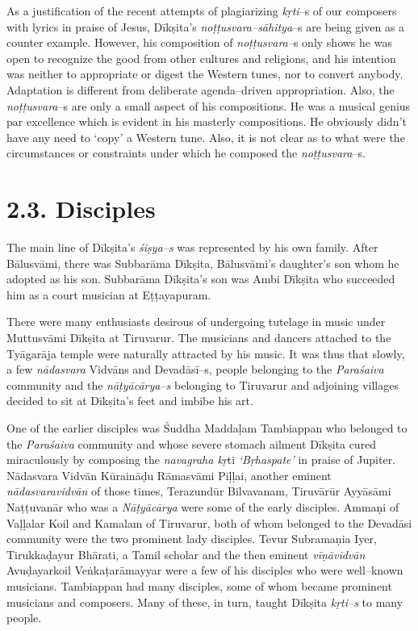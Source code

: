 As a justification of the recent attempts of plagiarizing \textit{kṛti}–s of our composers with lyrics in praise of Jesus, Dīkṣita’s \textit{noṭṭusvara–sāhitya}–s are being given as a counter example. However, his composition of \textit{noṭṭusvara–}s only shows he was open to recognize the good from other cultures and religions, and his intention was neither to appropriate or digest the Western tunes, nor to convert anybody. Adaptation is different from deliberate agenda–driven appropriation. Also, the \textit{noṭṭusvara}–s are only a small aspect of his compositions. He was a musical genius par excellence which is evident in his masterly compositions. He obviously didn’t have any need to ‘copy’ a Western tune. Also, it is not clear as to what were the circumstances or constraints under which he composed the \textit{noṭṭusvara}–s.



\section*{2.3. Disciples}

The main line of Dīkṣita’s \textit{śiṣya–s} was represented by his own family. After Bālusvāmi, there was Subbarāma Dīkṣita, Bālusvāmi’s daughter’s son whom he adopted as his son. Subbarāma Dīkṣita’s son was Ambi Dīkṣita who succeeded him as a court musician at Eṭṭayapuram.

There were many enthusiasts desirous of undergoing tutelage in music under Muttusvāmi Dīkṣita at Tiruvarur. The musicians and dancers attached to the Tyāgarāja temple were naturally attracted by his music. It was thus that slowly, a few \textit{nādasvara} Vidvāns and Devadāsī–s, people belonging to the \textit{Paraśaiva} community and the \textit{nāṭyācārya–s} belonging to Tiruvarur and adjoining villages decided to sit at Dīkṣita's feet and imbibe his art.

One of the earlier disciples was Śuddha Maddaḷam Tambiappan who belonged to the \textit{Paraśaiva} community and whose severe stomach ailment Dīkṣita cured miraculously by composing the \textit{navagraha kṛ}ti\textit{ ‘Bṛhaspate’} in praise of Jupiter. Nādasvara Vidvān Kūraināḍu Rāmasvāmi Piḷḷai, another eminent \textit{nādasvaravidvān} of those times, Terazundūr Bilvavanam, Tiruvārūr Ayyāsāmi Naṭṭuvanār who was a \textit{Nāṭyācārya} were some of the early disciples. Ammaṇi of Vaḷḷalar Koil and Kamalam of Tiruvarur, both of whom belonged to the Devadāsi community were the two prominent lady disciples. Tevur Subramaṇia Iyer, Tirukkaḍayur Bhārati, a Tamil scholar and the then eminent \textit{vīṇāvidvān} Avuḍayarkoil Veṅkaṭarāmayyar were a few of his disciples who were well–known musicians. Tambiappan had many disciples, some of whom became prominent musicians and composers. Many of these, in turn, taught Dīkṣita \textit{kṛti–s} to many people.

